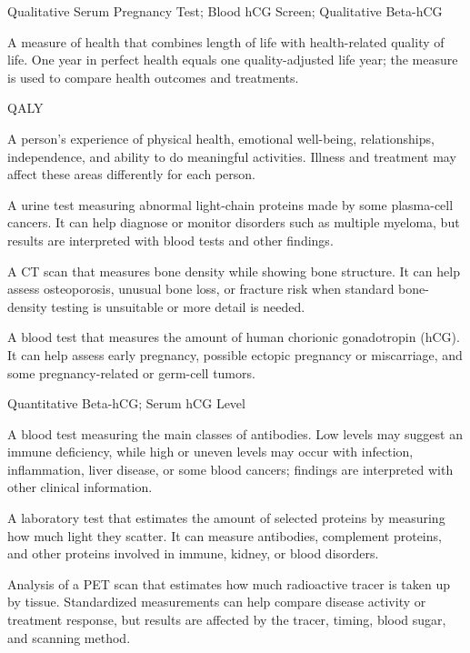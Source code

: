 \synonyms
Qualitative Serum Pregnancy Test; Blood hCG Screen; Qualitative Beta-hCG

 A measure of health that combines length of life with health-related quality of life. One year in perfect health equals one quality-adjusted life year; the measure is used to compare health outcomes and treatments.

\synonyms
QALY

 A person’s experience of physical health, emotional well-being, relationships, independence, and ability to do meaningful activities. Illness and treatment may affect these areas differently for each person.

 A urine test measuring abnormal light-chain proteins made by some plasma-cell cancers. It can help diagnose or monitor disorders such as multiple myeloma, but results are interpreted with blood tests and other findings.

 A CT scan that measures bone density while showing bone structure. It can help assess osteoporosis, unusual bone loss, or fracture risk when standard bone-density testing is unsuitable or more detail is needed.

 A blood test that measures the amount of human chorionic gonadotropin (hCG). It can help assess early pregnancy, possible ectopic pregnancy or miscarriage, and some pregnancy-related or germ-cell tumors.

\synonyms
Quantitative Beta-hCG; Serum hCG Level

 A blood test measuring the main classes of antibodies. Low levels may suggest an immune deficiency, while high or uneven levels may occur with infection, inflammation, liver disease, or some blood cancers; findings are interpreted with other clinical information.

 A laboratory test that estimates the amount of selected proteins by measuring how much light they scatter. It can measure antibodies, complement proteins, and other proteins involved in immune, kidney, or blood disorders.

 Analysis of a PET scan that estimates how much radioactive tracer is taken up by tissue. Standardized measurements can help compare disease activity or treatment response, but results are affected by the tracer, timing, blood sugar, and scanning method.

